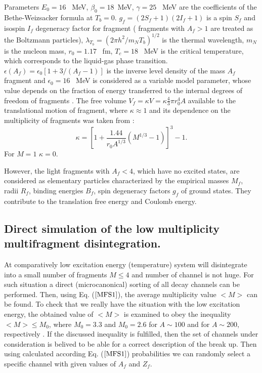 Parameters $E_0 = 16$ \ MeV, $\beta_0 = 18$\ MeV, $\gamma = 25$ \ MeV
are the coefficients of the Bethe-Weizsacker formula at $T_b = 0$.
$g_f=(2S_f+1)(2I_f+1)$ is a spin $S_f$ and isospin $I_f$ degeneracy
factor for fragment ( fragments with $A_f > 1$ are treated as the
Boltzmann particles), $\lambda_{T_b} = (2\pi h^2/m_N T_b)^{1/2}$ is the
thermal wavelength, $m_N$ is the nucleon mass, $r_0 = 1.17$ \ fm,
$T_c=18$ \ MeV is the critical temperature, which corresponds to the
liquid-gas phase transition. $\epsilon(A_f) = \epsilon_0[1 + 3/(A_f-1)]$
is the inverse level density of the mass $A_f$ fragment and
$\epsilon_0=16$ \ MeV is considered as a variable model parameter, whose
value depends on the fraction of energy transferred to the internal
degrees of freedom of fragments \cite{Botvina87}. The free volume $V_f
=\kappa V=\kappa\frac{4}{3}\pi r_0^4 A$ available to the translational
motion of fragment, where $\kappa \approx 1$ and its dependence on the
multiplicity of fragments was taken from \cite{Botvina87}:
\begin{equation}
\label{MFS13}\kappa =[1 + \frac{1.44}{r_0A^{1/3}}(M^{1/3} - 1)]^{3} - 1.
\end{equation}
For $M = 1$ $\kappa = 0$.

However, the light fragments with $A_f < 4$, which have no excited
states, are considered as elementary particles characterized by the
empirical masses $M_f$, radii $R_f$, binding energies $B_f$, spin
degeneracy factors $g_f$ of ground states.  They contribute to the
translation free energy and Coulomb energy.


\subsection{ Direct simulation of the low multiplicity multifragment
disintegration.} 

\hspace{1.0em}At comparatively low excitation energy (temperature)
system will disintegrate into a small number of fragments $M \leq 4$ and
number of channel is not huge. For such situation a direct
(microcanonical) sorting of all decay channels can be performed. Then,
using Eq. ($\ref{MFS1}$), the average multiplicity value $<M>$ can be
found.  To check that we really have the situation with the low
excitation energy, the obtained value of $<M>$ is examined to obey the
inequality $<M> \leq M_0$, where $M_0 = 3.3$ and $M_0 = 2.6$ for $A \sim
100$ and for $A \sim 200$, respectively \cite{Botvina87}.  If the
discussed inequality is fulfilled, then the set of channels under
consideration is belived to be able for a correct description of the
break up. Then using calculated according Eq. ($\ref{MFS1}$)
probabilities we can randomly select a specific channel with given
values of $A_f$ and $Z_f$.
 


